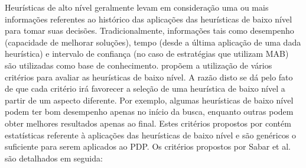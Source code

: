 Heurísticas de alto nível geralmente levam em consideração uma ou mais informações referentes ao histórico das aplicações das heurísticas de baixo nível para tomar suas decisões. Tradicionalmente, informações tais como desempenho (capacidade de melhorar soluções), tempo (desde a última aplicação de uma dada heurística) e intervalo de confiança (no caso de estratégias que utilizam MAB) são utilizadas como base de conhecimento. \cite{sabar2015automatic} propõem a utilização de vários critérios para avaliar as heurísticas de baixo nível. A razão disto se dá pelo fato de que cada critério irá favorecer a seleção de uma heurística de baixo nível a partir de um aspecto diferente. Por exemplo, algumas heurísticas de baixo nível podem ter bom desempenho apenas no início da busca, enquanto outras podem obter melhores resultados apenas ao final. Estes critérios propostos por \cite{sabar2015automatic} contém estatísticas referente à aplicações das heurísticas de baixo nível e são genéricos o suficiente para serem aplicados ao PDP. Os critérios propostos por Sabar et al. \cite{sabar2015automatic} são detalhados em seguida:


